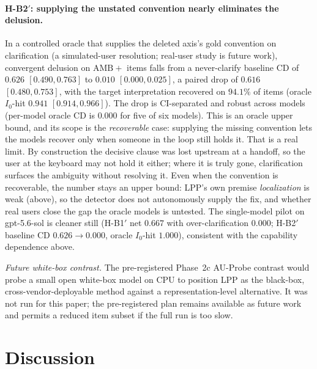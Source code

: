 \documentclass[acmsmall,screen,nonacm]{acmart}
\newcommand{\cd}{\textsf{CD}}
\begin{document}
\paragraph{H-B2$'$: supplying the unstated convention nearly eliminates the delusion.} In a controlled
oracle that supplies the deleted axis's gold convention on clarification (a simulated-user resolution;
real-user study is future work), convergent delusion on $\mathrm{AMB}{+}$ items falls from a never-clarify
baseline \cd{} of \textbf{$0.626$ $[0.490, 0.763]$} to \textbf{$0.010$ $[0.000, 0.025]$}, a paired drop of
$0.616$ $[0.480, 0.753]$, with the target interpretation recovered on $94.1\%$ of items (oracle $I_0$-hit
$0.941$ $[0.914, 0.966]$). The drop is CI-separated and robust across models (per-model oracle \cd{} is
$0.000$ for five of six models). This is an oracle upper bound, and its scope is the \emph{recoverable} case:
supplying the missing convention lets the models recover only when someone in the loop still holds it. That
is a real limit. By construction the decisive clause was lost upstream at a handoff, so the user at the
keyboard may not hold it either; where it is truly gone, clarification surfaces the ambiguity without
resolving it. Even when the convention is recoverable, the number stays an upper bound: LPP's own premise
\emph{localization} is weak (above), so the detector does not autonomously supply the fix, and whether real
users close the gap the oracle models is untested.
The single-model pilot on gpt-5.6-sol is cleaner still (H-B1$'$ net $0.667$ with over-clarification $0.000$;
H-B2$'$ baseline \cd{} $0.626\!\to\!0.000$, oracle $I_0$-hit $1.000$), consistent with the capability
dependence above.

\emph{Future white-box contrast.} The pre-registered Phase~2c AU-Probe contrast would probe a small open
white-box model on CPU to position LPP as the black-box, cross-vendor-deployable method against a
representation-level alternative. It was not run for this paper; the pre-registered plan remains available
as future work and permits a reduced item subset if the full run is too slow.

\section{Discussion}
\label{sec:discussion}
\end{document}
